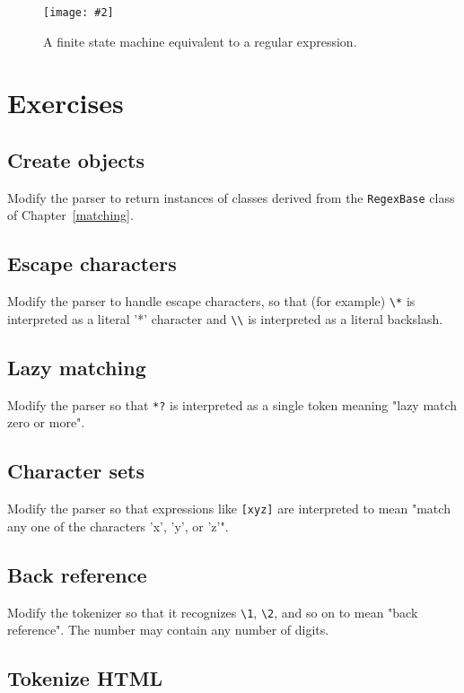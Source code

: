 \documentclass{scrbook}
\newcommand{\chapref}[1]{Chapter~\ref{#1}}
\newcommand{\figpdf}[4]{\begin{figure}%
\centering%
\texttt{[image: \#2]}%
\caption{#3}%
\label{#1}%
\end{figure}}
\begin{document}
\figpdf{parser-fsm}{./parser/finite_state_machine.pdf}{A finite state machine equivalent to a regular expression.}{0.6}

\section{Exercises}\label{parser-exercises}

\subsection*{Create objects}


Modify the parser to return instances of classes derived from
the \texttt{RegexBase} class of \chapref{matching}.

\subsection*{Escape characters}


Modify the parser to handle escape characters,
so that (for example) \texttt{{\textbackslash}*} is interpreted as a literal '*' character
and \texttt{{\textbackslash}{\textbackslash}} is interpreted as a literal backslash.

\subsection*{Lazy matching}


Modify the parser so that \texttt{*?} is interpreted as a single token
meaning "lazy match zero or more".

\subsection*{Character sets}


Modify the parser so that expressions like \texttt{[xyz]} are interpreted to mean
"match any one of the characters 'x', 'y', or 'z'".

\subsection*{Back reference}


Modify the tokenizer so that it recognizes \texttt{{\textbackslash}1}, \texttt{{\textbackslash}2}, and so on to mean "back reference".
The number may contain any number of digits.

\subsection*{Tokenize HTML}
\end{document}
